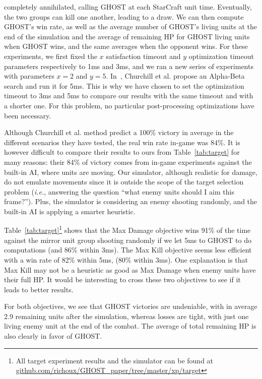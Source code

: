 \documentclass[journal]{IEEEtran}
\newcommand{\ghost}{\textsc{GHOST}\xspace}
\newcommand{\ie}{\textit{i.e.}}
\begin{document}
completely  annihilated,   calling  \ghost  at  each   StarCraft  unit
time. Eventually,  the two groups can  kill one another, leading  to a
draw. We  can then compute \ghost's  win rate, as well  as the average
number of \ghost's  living units at the end of  the simulation and the
average of remaining HP for \ghost  living units when \ghost wins, and
the same  averages when the  opponent wins. For these  experiments, we
first fixed the $x$ satisfaction  timeout and $y$ optimization timeout
parameters respectively  to 1ms and  3ms, and we  ran a new  series of
experiments with parameters  $x=2$ and $y=5$.  In~\cite{ChurchillSB12,
  ChurchillB12}, Churchill et al. propose an Alpha-Beta search and run
it  for 5ms.   This is  why  we have  chosen to  set the  optimization
timeout to  3ms and 5ms to  compare our results with  the same timeout
and   with  a   shorter  one.    For  this   problem,  no   particular
post-processing optimizations have been necessary.

Although Churchill et al. method predict a 100\% victory in average in
the different  scenarios they have  tested, the real win  rate in-game
was 84\%.   It is however difficult  to compare their results  to ours
from Table~\ref{tab:target}  for many  reasons: their 84\%  of victory
comes from  in-game experiments against  the built-in AI,  where units
are  moving. Our  simulator,  although realistic  for  damage, do  not
emulate  movements  since  it  is  outside the  scope  of  the  target
selection  problem (\ie,  answering  the question  ``what enemy  units
should I  aim this  frame?''). Plus, the  simulator is  considering an
enemy shooting  randomly, and  the built-in AI  is applying  a smarter
heuristic.

Table~\ref{tab:target}\footnote{All target experiment  results and the
  simulator            can            be           found            at
  \href{https://github.com/richoux/GHOST\_paper/tree/master/xp/target}{github.com/richoux/GHOST\_paper/tree/master/xp/target}}
shows that the Max Damage objective  wins 91\% of the time against the
mirror unit  group shooting  randomly if  we let 5ms  to \ghost  to do
computations (and 86\% within 3ms).  The Max Kill objective seems less
efficient with a  win rate of 82\% within 5ms,  (80\% within 3ms). One
explanation is  that Max Kill  may not be a  heuristic as good  as Max
Damage when enemy  units have their full HP.  It  would be interesting
to cross these two objectives to see if it leads to better results.

For both objectives, we see that \ghost victories are undeniable, with
in average  2.9 remaining units  after the simulation,  whereas losses
are  tight,  with  just one  living  enemy  unit  at  the end  of  the
combat. The average of total remaining  HP is also clearly in favor of
\ghost.
\end{document}
